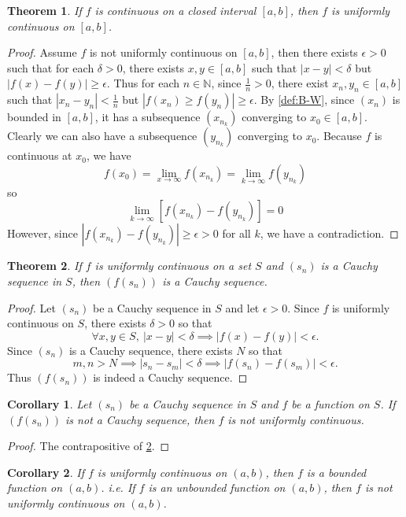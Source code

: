 \documentclass[12pt, lettersize]{book}
\theoremstyle{plain}
\newtheorem{thm}{Theorem}[section]
\newtheorem{cor}{Corollary}[thm]
\theoremstyle{definition}
\theoremstyle{remark}
\newcommand{\N}{\mathbb{N}}
\begin{document}
			\begin{thm}\label{def:19.2}
			If $f$ is continuous on a closed interval $[a,b]$, then $f$ is uniformly continuous on $[a,b]$.
			\end{thm}
			\begin{proof}
			Assume $f$ is not uniformly continuous on $[a,b]$, then there exists $\epsilon>0$ such that for each $\delta>0$,
			there exists $x,y\in[a,b]$ such that $|x-y|<\delta$ but $|f(x)-f(y)|\geq\epsilon$. Thus for each $n\in\N$, since
			$\frac{1}{n}>0$, there exist $x_n,y_n\in[a,b]$ such that $|x_n-y_n|<\frac{1}{n}$ but $|f(x_n)\geq f(y_n)|\geq\epsilon$. By \ref{def:B-W}, since $(x_n)$ is bounded in $[a,b]$, it has a subsequence $(x_{n_k})$
			converging to $x_0\in[a,b]$. Clearly we can also have a subsequence $(y_{n_k})$ converging to $x_0$. Because $f$
			is continuous at $x_0$, we have 
			\begin{displaymath}
				f(x_0)=\lim\limits_{x\rightarrow\infty}f(x_{n_k})=\lim_{k\rightarrow\infty}f(y_{n_k})
			\end{displaymath}
			so
			\begin{displaymath}
				\lim_{k\rightarrow\infty}[f(x_{n_k})-f(y_{n_k})]=0
			\end{displaymath} 
			However, since $|f(x_{n_k})-f(y_{n_k})|\geq\epsilon>0$ for all $k$, we have a contradiction.
			\end{proof}
			
			\begin{thm}\label{thm:19.4}
			If $f$ is uniformly continuous on a set $S$ and $(s_n)$ is a Cauchy sequence in $S$, then $(f(s_n))$ is a 
			Cauchy sequence.
			\end{thm}
			\begin{proof}
			Let $(s_n)$ be a Cauchy sequence in $S$ and let $\epsilon>0$. Since $f$ is uniformly continuous on $S$, there
			exists $\delta>0$ so that
			\begin{displaymath}
				\forall x,y\in S,\ |x-y|<\delta\implies|f(x)-f(y)|<\epsilon.
			\end{displaymath}
			Since $(s_n)$ is a Cauchy sequence, there exists $N$ so that
			\begin{displaymath}
				m,n>N\implies|s_n-s_m|<\delta\implies|f(s_n)-f(s_m)|<\epsilon.
			\end{displaymath}
			Thus $(f(s_n))$ is indeed a Cauchy sequence.
			\end{proof}
			\begin{cor}
			Let $(s_n)$ be a Cauchy sequence in $S$ and $f$ be a function on $S$. If $(f(s_n))$ is not a Cauchy sequence, then $f$ is not \emph{uniformly continuous}.
			\end{cor}
			\begin{proof}
				The contrapositive of \ref{thm:19.4}.
			\end{proof}
			\begin{cor}
			If $f$ is uniformly continuous on $(a,b)$, then $f$ is a bounded function on $(a,b)$. i.e. If $f$ is an unbounded function on $(a,b)$, then $f$ is not uniformly continuous on $(a,b)$.
			\end{cor}
			
\end{document}
